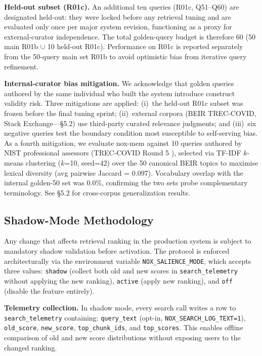 \textbf{Held-out subset (R01c).} An additional ten queries (R01c, Q51--Q60) are designated
held-out: they were locked before any retrieval tuning and are evaluated only once per
major system revision, functioning as a proxy for external-curator independence. The
total golden-query budget is therefore 60 (50 main R01b $\cup$ 10 held-out R01c).
Performance on R01c is reported separately from the 50-query main set R01b to avoid
optimistic bias from iterative query refinement.

\textbf{Internal-curator bias mitigation.} We acknowledge that golden queries authored by
the same individual who built the system introduce construct validity risk. Three
mitigations are applied: (i)~the held-out R01c subset was frozen before the final tuning
sprint; (ii)~external corpora (BEIR TREC-COVID, Stack Exchange---\S5.2) use third-party
curated relevance judgments; and (iii)~six negative queries test the boundary condition
most susceptible to self-serving bias. As a fourth mitigation, we evaluate nox-mem against
10 queries authored by NIST professional assessors (TREC-COVID Round 5
\cite{thakur2021beir}), selected via TF-IDF $k$-means clustering ($k$=10, seed=42) over
the 50 canonical BEIR topics to maximise lexical diversity (avg pairwise Jaccard = 0.097).
Vocabulary overlap with the internal golden-50 set was 0.0\%, confirming the two sets
probe complementary terminology. See \S5.2 for cross-corpus generalization results.

\subsection{Shadow-Mode Methodology}

Any change that affects retrieval ranking in the production system is subject to mandatory
shadow validation before activation. The protocol is enforced architecturally via the
environment variable \texttt{NOX\_SALIENCE\_MODE}, which accepts three values:
\texttt{shadow} (collect both old and new scores in \texttt{search\_telemetry} without
applying the new ranking), \texttt{active} (apply new ranking), and \texttt{off} (disable
the feature entirely).

\textbf{Telemetry collection.} In shadow mode, every search call writes a row to
\texttt{search\_telemetry} containing: \texttt{query\_text} (opt-in,
\texttt{NOX\_SEARCH\_LOG\_TEXT=1}), \texttt{old\_score}, \texttt{new\_score},
\texttt{top\_chunk\_ids}, and \texttt{top\_scores}. This enables offline comparison of
old and new score distributions without exposing users to the changed ranking.

